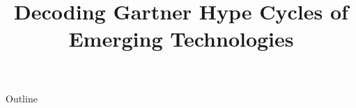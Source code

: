 \documentclass[xcolor=dvipsnames,compress,t,pdf,9pt]{beamer}
\title[\insertframenumber /\inserttotalframenumber]{Decoding Gartner Hype Cycles of Emerging Technologies}
\begin{document}
	\begin{frame}
	\titlepage
	\end{frame}
	
	\begin{frame}{Outline}
	    \tableofcontents
	\end{frame}

	
	

	
	
\end{document}
